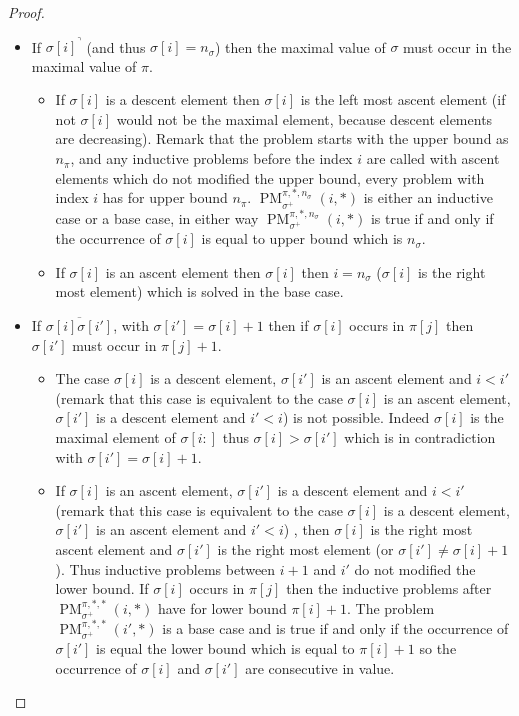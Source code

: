 \documentclass[a4paper]{llncs}
\newcommand{\ptext}{\pi}
\newcommand{\pmotif}{\sigma}
\newcommand{\pbmotif}{\pmotif^+}
\DeclareMathOperator{\PMa}{PM}
\newcommand{\PM}[6]{\PMa_{{#1}}^{{#2},{#3},{#4}}({#5},{#6})}
\begin{document}
\begin{proof}
\begin{itemize}
	
	\item If ${\pmotif[i]}^\urcorner$ (and thus $\sigma[i]=n_\pmotif$) then the maximal value of $\pmotif$ must occur in the maximal value of $\ptext$.
	\begin{itemize}
		\item If $\sigma[i]$ is a descent element then $\sigma[i]$ is the left most ascent element (if not $\sigma[i]$ would not be the maximal element, because descent elements are decreasing). Remark that the problem starts with the upper bound as $n_\ptext$, and any inductive problems before the index $i$ are called with ascent elements which do not modified the upper bound, every problem with index $i$ has for upper bound $n_\ptext$. 		$\PM{\pbmotif}{\ptext}{*}{n_\pmotif}{i}{*}$ is either an inductive case or a base case, in either way  $\PM{\pbmotif}{\ptext}{*}{n_\pmotif}{i}{*}$ is true if and only if the occurrence of $\sigma[i]$ is equal to upper bound which is  $n_\pmotif$.
		
		
		\item If $\sigma[i]$ is an ascent element then $\sigma[i]$ then $i=n_\pmotif$ ($\sigma[i]$ is the right most element) which is solved in the base case.
	\end{itemize}
	
	  
	
	\item  If $\overline{\pmotif[i]\pmotif[i']}$, with $\pmotif[i']=\pmotif[i]+1$ then if $\pmotif[i]$ occurs in $\ptext[j]$ then $\pmotif[i']$ must occur in $\ptext[j]+1$. 
		\begin{itemize}
			\item The case $\pmotif[i]$ is a descent element, $\pmotif[i']$ is an ascent element and $i<i'$ (remark that this case is equivalent to the case $\pmotif[i]$ is an ascent element, $\pmotif[i']$ is a descent element and $i'<i$) is not possible. 
			Indeed $\pmotif[i]$ is the maximal element of $\pmotif[i:]$ thus $\pmotif[i] > \pmotif[i']$ which is in contradiction with 
			$\pmotif[i']=\pmotif[i]+1$. 
			
			\item If $\pmotif[i]$ is an ascent element, $\pmotif[i']$ is a descent element and $i<i'$ (remark that this case is equivalent to the case $\pmotif[i]$ is a descent element, $\pmotif[i']$ is an ascent element and $i'<i$) , then
			$\pmotif[i]$ is the right most ascent element and $\pmotif[i']$ is the right most element (or $\pmotif[i'] \neq \pmotif[i]+1$). Thus inductive problems between $i+1$ and $i'$ do not modified the lower bound. If $\sigma[i]$ occurs in $\ptext[j]$ then the inductive problems after $\PM{\pbmotif}{\ptext}{*}{*}{i}{*}$ have for lower bound $\ptext[i]+1$. The problem $\PM{\pbmotif}{\ptext}{*}{*}{i'}{*}$ is a base case and is true if and only if
			the occurrence of $\sigma[i']$ is equal the lower bound which is equal to $\ptext[i]+1$ so the occurrence of $\pmotif[i]$ and $\pmotif[i']$ are consecutive in value.
				

\end{itemize}
\end{itemize}
\end{proof}
\end{document}

